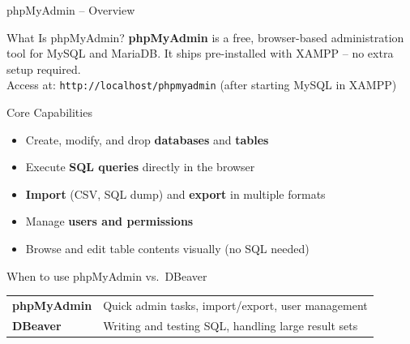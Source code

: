 \begin{frame}{phpMyAdmin -- Overview}
  \begin{block}{What Is phpMyAdmin?}
    \textbf{phpMyAdmin} is a free, browser-based administration tool for MySQL
    and MariaDB. It ships pre-installed with XAMPP -- no extra setup required.\\[0.4em]
    Access at: \texttt{http://localhost/phpmyadmin} (after starting MySQL in XAMPP)
  \end{block}

  \begin{block}{Core Capabilities}
    \begin{itemize}
      \item Create, modify, and drop \textbf{databases} and \textbf{tables}
      \item Execute \textbf{SQL queries} directly in the browser
      \item \textbf{Import} (CSV, SQL dump) and \textbf{export} in multiple formats
      \item Manage \textbf{users and permissions}
      \item Browse and edit table contents visually (no SQL needed)
    \end{itemize}
  \end{block}

  \begin{alertblock}{When to use phpMyAdmin vs.\ DBeaver}
    \begin{tabular}{@{}ll@{}}
      \textbf{phpMyAdmin}  & Quick admin tasks, import/export, user management \\
      \textbf{DBeaver}     & Writing and testing SQL, handling large result sets \\
    \end{tabular}
  \end{alertblock}
\end{frame}

